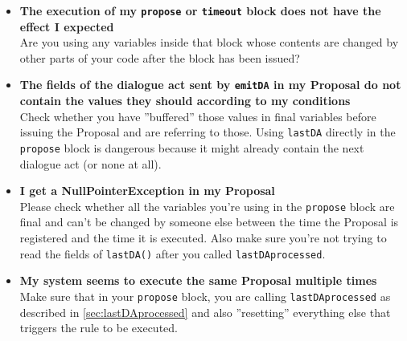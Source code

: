 \begin{itemize}
	
	\item \textbf{The execution of my \texttt{propose} or \texttt{timeout} block does not have the effect I expected}\\
	Are you using any variables inside that block whose contents are changed by other parts of your code after the block has been issued?
	
	\item \textbf{The fields of the dialogue act sent by \texttt{emitDA} in my Proposal do not contain the values they should according to my conditions}\\
	Check whether you have ''buffered'' those values in final variables before issuing the Proposal and are referring to those. Using \texttt{lastDA} directly in the \texttt{propose} block is dangerous because it might already contain the next dialogue act (or none at all).
	
	\item \textbf{I get a NullPointerException in my Proposal}\\
	Please check whether all the variables you're using in the \texttt{propose} block are final and can't be changed by someone else between the time the Proposal is registered and the time it is executed. Also make sure you're not trying to read the fields of \texttt{lastDA()} after you called \texttt{lastDAprocessed}.
	
	\item \textbf{My system seems to execute the same Proposal multiple times}\\
	Make sure that in your \texttt{propose} block, you are calling \texttt{lastDAprocessed} as described in \ref{sec:lastDAprocessed} and also ''resetting'' everything else that triggers the rule to be executed.
	
	
\end{itemize}